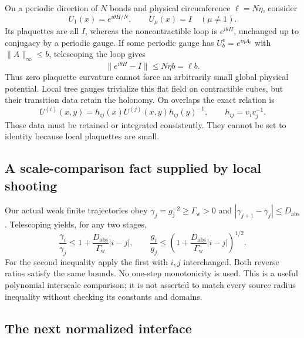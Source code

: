 \documentclass[11pt]{article}
\theoremstyle{remark}
\begin{document}
On a periodic direction of \(N\) bonds and physical circumference
\(\ell=N\eta\), consider
\[
       U_1(x)=e^{i\theta H/N},\qquad U_\mu(x)=I\quad(\mu\ne1).
\]
Its plaquettes are all \(I\), whereas the noncontractible loop is
\(e^{i\theta H}\), unchanged up to conjugacy by a periodic gauge.
If some periodic gauge has \(U_b^v=e^{i\eta A_b}\) with
\(\|A\|_\infty\le b\), telescoping the loop gives
\begin{equation}
                  \|e^{i\theta H}-I\|\le N\eta b=\ell b.
 \label{fmg-holonomy-bound}
\end{equation}
Thus zero plaquette curvature cannot force an arbitrarily small
global physical potential. Local tree gauges trivialize this
flat field on contractible cubes, but their transition data
retain the holonomy. On overlaps the exact relation is
\begin{equation}
 U^{(i)}(x,y)=h_{ij}(x)U^{(j)}(x,y)h_{ij}(y)^{-1},
 \qquad h_{ij}=v_i v_j^{-1}.
 \label{fmg-transitions}
\end{equation}
Those data must be retained or integrated consistently. They
cannot be set to identity because local plaquettes are small.

\subsection{A scale-comparison fact supplied by local shooting}
\label{fmg-couplings}

Our actual weak finite trajectories obey
\(\gamma_j=g_j^{-2}\ge\Gamma_{\mathrm w}>0\) and
\(|\gamma_{j+1}-\gamma_j|\le D_{\mathrm{abs}}\).
Telescoping yields, for any two stages,
\begin{equation}
 \frac{\gamma_i}{\gamma_j}
       \le1+\frac{D_{\mathrm{abs}}}{\Gamma_{\mathrm w}}|i-j|,
 \qquad
 \frac{g_i}{g_j}
       \le\left(1+\frac{D_{\mathrm{abs}}}
                          {\Gamma_{\mathrm w}}|i-j|\right)^{1/2}.
 \label{fmg-coupling-comparison}
\end{equation}
For the second inequality apply the first with \(i,j\) interchanged.
Both reverse ratios satisfy the same bounds. No one-step
monotonicity is used. This is a useful polynomial interscale
comparison; it is not asserted to match every source radius
inequality without checking its constants and domains.

\subsection{The next normalized interface}
\label{fmg-next}
\end{document}
